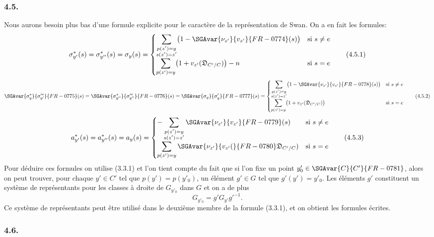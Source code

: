 \subsubsection*{4.5.}

Nous
aurons besoin plus bas d'une formule explicite pour le caractère de la représentation de Swan. On a en fait les formules:
\[
\sigma^{*}_{y'}(s)=\sigma^{*}_{y''}(s)=\sigma_y(s)=
\begin{cases}
\displaystyle\sum_{\substack{p(z')=y\\s(z')=z'}}\bigl(1-\SGAvar{\nu_{z'}}{v_{z'}}{FR-0774}(s)\bigr)& \text{si } s\ne e\\[0.8em]
\displaystyle\sum_{p(z')=y}\bigl(1+v_{z'}(\mathfrak{D}_{C'/C})\bigr)-n& \text{si } s=e
\end{cases}
\tag{4.5.1}
\]
\[
\SGAvar{\sigma^{*}_{y}}{\sigma^{\prime*}_{y'}}{FR-0775}(s)=\SGAvar{\sigma^{*}_{y''}}{\sigma^{\prime*}_{y''}}{FR-0776}(s)=\SGAvar{\sigma_y}{\sigma'_y}{FR-0777}(s)=
\begin{cases}
\displaystyle\sum_{\substack{p(z')=y\\s(z')=z'}}\bigl(1-\SGAvar{\nu_{z'}}{v_{z'}}{FR-0778}(s)\bigr)& \text{si } s\ne e\\[0.8em]
\displaystyle\sum_{p(z')=y}\bigl(1+v_{z'}(\mathfrak{D}_{C'/C})\bigr)& \text{si } s=e
\end{cases}
\tag{4.5.2}
\]
\[
a^{*}_{y'}(s)=a^{*}_{y''}(s)=a_y(s)=
\begin{cases}
\displaystyle-\sum_{\substack{p(z')=y\\s(z')=z'}}\SGAvar{\nu_{z'}}{v_{z'}}{FR-0779}(s)& \text{si } s\ne e\\[0.8em]
\displaystyle\sum_{p(z')=y}\SGAvar{\nu_{z'}}{v_{z'}(}{FR-0780}\mathfrak{D}_{C'/C})& \text{si } s=e
\end{cases}
\tag{4.5.3}
\]
Pour déduire ces formules on utilise (3.3.1) et l'on tient compte du fait que si l'on fixe un point $y'_0\in \SGAvar{C}{C'}{FR-0781}$, alors on peut trouver, pour chaque $y'\in C'$ tel que $p(y')=p(y'_0)$, un élément $g'\in G$ tel que $g'(y')=y'_0$. Les éléments $g'$ constituent un système de représentants pour les classes à droite de $G_{y'_0}$ dans $G$ et on a de plus
\[
G_{y'_0}=g'G_{y'}g'^{-1}.
\]
Ce système de représentants peut être utilisé dans le deuxième membre de la formule (3.3.1), et on obtient les formules écrites.

\subsubsection*{4.6.}

